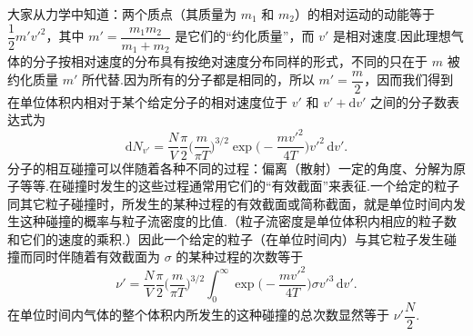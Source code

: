 大家从力学中知道：两个质点（其质量为 $m_1$ 和 $m_2$）的相对运动的动能等于 $\dfrac{1}{2}m'v'^2$，其中 $m'=\dfrac{m_1m_2}{m_1+m_2}$ 是它们的“约化质量”，而 $v'$ 是相对速度.因此理想气体的分子按相对速度的分布具有按绝对速度分布同样的形式，不同的只在于 $m$ 被约化质量 $m'$ 所代替.因为所有的分子都是相同的，所以 $m'=\dfrac{m}{2}$，因而我们得到在单位体积内相对于某个给定分子的相对速度位于 $v'$ 和 $v'+\mathrm{d}v'$ 之间的分子数表达式为
\begin{equation}
  \mathrm{d}N_{v'}=\frac{N}{V}\frac{\pi}{2}\Big(\frac{m}{\pi T}\Big)^{3/2}
  \exp\Big(-\frac{mv'^2}{4T}\Big)v'^2\,\mathrm{d}v'.
\end{equation}
分子的相互碰撞可以伴随着各种不同的过程：偏离（散射）一定的角度、分解为原子等等.在碰撞时发生的这些过程通常用它们的“有效截面”来表征.一个给定的粒子同其它粒子碰撞时，所发生的某种过程的有效截面或简称截面，就是单位时间内发生这种碰撞的概率与粒子流密度的比值.（粒子流密度是单位体积内相应的粒子数和它们的速度的乘积.）因此一个给定的粒子（在单位时间内）与其它粒子发生碰撞而同时伴随着有效截面为 $\sigma$ 的某种过程的次数等于
\begin{equation}
  \nu'=\frac{N}{V}\frac{\pi}{2}\Big(\frac{m}{\pi T}\Big)^{3/2}
  \int_0^{\infty}\exp\Big(-\frac{mv'^2}{4T}\Big)\sigma v'^3\,\mathrm{d}v'.
\end{equation}
在单位时间内气体的整个体积内所发生的这种碰撞的总次数显然等于 $\nu'\dfrac{N}{2}$.


